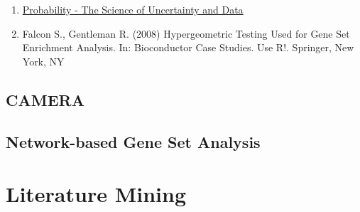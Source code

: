 \documentclass[]{book}
\providecommand{\tightlist}{%
  \setlength{\itemsep}{0pt}\setlength{\parskip}{0pt}}
\begin{document}
\begin{enumerate}
\def\labelenumi{\arabic{enumi}.}
\tightlist
\item
  \href{https://www.edx.org/course/probability-the-science-of-uncertainty-and-data}{Probability
  - The Science of Uncertainty and Data}
\item
  Falcon S., Gentleman R. (2008) Hypergeometric Testing Used for Gene
  Set Enrichment Analysis. In: Bioconductor Case Studies. Use R!.
  Springer, New York, NY
\end{enumerate}

\section{CAMERA}\label{camera}

\section{Network-based Gene Set
Analysis}\label{network-based-gene-set-analysis}

\chapter{Literature Mining}\label{lit}


\end{document}
